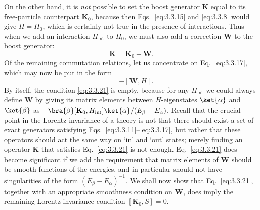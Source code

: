 On the other hand, it is \textit{not} possible to set the boost generator
$\mathbf{K}$ equal to its free-particle counterpart $\mathbf{K}_0$, because then
Eqs.~\eqref{eq:3.3.15} and \eqref{eq:3.3.8} would give $H=H_0$, which is certainly not true in the
presence of interactions. Thus when we add an interaction $H_{\mathrm{int}}$ to
$H_0$, we must also add a correction $\mathbf{W}$ to the boost generator:
\begin{equation}
\mathbf{K}=\mathbf{K}_0+\mathbf{W}.
\tag{3.3.20}\label{eq:3.3.20}
\end{equation}
Of the remaining commutation relations, let us concentrate on Eq.~\eqref{eq:3.3.17}, which
may now be put in the form
\begin{equation}
[\mathbf{K}_0,H_{\mathrm{int}}]=-[\mathbf{W},H].
\tag{3.3.21}\label{eq:3.3.21}
\end{equation}
By itself, the condition \eqref{eq:3.3.21} is empty, because for any $H_{\mathrm{int}}$ we
could always define $\mathbf{W}$ by giving its matrix elements between
$H$-eigenstates $\ket{\alpha}$ and $\ket{\beta}$ as
$-\bra{\beta}[\mathbf{K}_0,H_{\mathrm{int}}]\ket{\alpha}/
(E_\beta-E_\alpha)$. Recall that the crucial point in the Lorentz invariance of a
theory is not that there should exist a set of exact generators satisfying
Eqs.~\eqref{eq:3.3.11}--\eqref{eq:3.3.17}, but rather that these operators should act the same way on
`in' and `out' states; merely finding an operator $\mathbf{K}$ that satisfies
Eq.~\eqref{eq:3.3.21} is not enough. Eq.~\eqref{eq:3.3.21} does become significant if we add the
requirement that matrix elements of $\mathbf{W}$ should be smooth functions of the
energies, and in particular should not have singularities of the form
$(E_\beta-E_\alpha)^{-1}$. We shall now show that Eq.~\eqref{eq:3.3.21}, together with an
appropriate smoothness condition on $\mathbf{W}$, does imply the remaining Lorentz
invariance condition $[\mathbf{K}_0,S]=0$.

